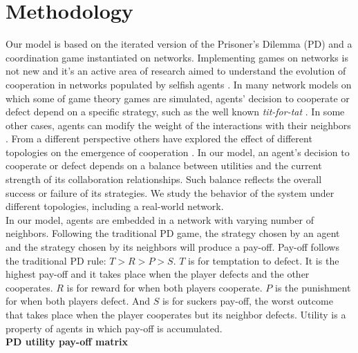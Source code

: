 \documentclass[11pt]{article}
\begin{document}
\section{Methodology}
\label{sec:2}

Our model is based on the iterated version of the Prisoner's Dilemma (PD) and a
coordination game instantiated on
networks. Implementing games on networks is not new and it's an active area of
research aimed to understand the evolution of cooperation in networks populated
by selfish agents \cite{Szabo2007,Nowak1992,Nowak2006,Santos2005,Santos2006}. In many network models
on which some of game theory games are simulated, agents' decision to cooperate
or defect depend on a specific strategy, such as the well known
\textit{tit-for-tat} \cite{Axelrod2006,Nowak2011}. In some other cases, agents
can modify the weight of the interactions with their neighbors
\cite{Santos2006}. From a different perspective others have explored the effect
of different topologies on the emergence of cooperation
\cite{Santos2005,Hauert2004}. {\color{red}In our model, an agent's decision to cooperate or
defect depends on a balance between
utilities and the current strength of its collaboration relationships. Such
balance reflects the overall success or failure of its strategies}. We
study the behavior of the system under different topologies, including a
real-world network.\\  


In our model, agents are embedded in a network with varying number of
neighbors. Following the traditional PD game, the strategy chosen by an agent
and the strategy chosen by its neighbors will produce a pay-off. Pay-off follows
the traditional PD rule: $T > R > P > S$. $T$ is for temptation to defect. It is the highest
pay-off and it takes place when the player defects and the other cooperates. $R$
is for reward for when both players cooperate. $P$ is the punishment for when
both players defect. And $S$ is for suckers pay-off, the worst outcome that
takes place when the player cooperates but its neighbor defects. Utility is a
property of agents in which pay-off is accumulated.\\   

{\bf PD utility pay-off matrix}\\
\end{document}

